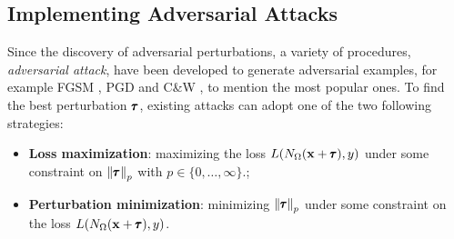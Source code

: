 \subsection{Implementing Adversarial Attacks}
\label{subsection:ch2-adversarial_attacks}

\noindent
Since the discovery of adversarial perturbations, a variety of procedures, \aka \emph{adversarial attack}, have been developed to generate adversarial examples, for example FGSM \cite{goodfellow2014explaining}, PGD \cite{madry2018towards} and C\&W \cite{carlini2017towards}, to mention the most popular ones.
To find the best perturbation $\pmb{\tau}$, existing attacks can adopt one of the two following strategies:
\begin{itemize}
  \item \textbf{Loss maximization}: maximizing the loss $L(N_\Omega(\mathbf{x} + \pmb{\tau}), y)$ under some constraint on $\norm{\pmb{\tau}}_p$ with $p \in \{0, \dots, \infty\}$.;
  \item \textbf{Perturbation minimization}: minimizing $\norm{\pmb{\tau}}_p$ under some constraint on the loss $L(N_\Omega(\mathbf{x} + \pmb{\tau}), y)$.
\end{itemize}


